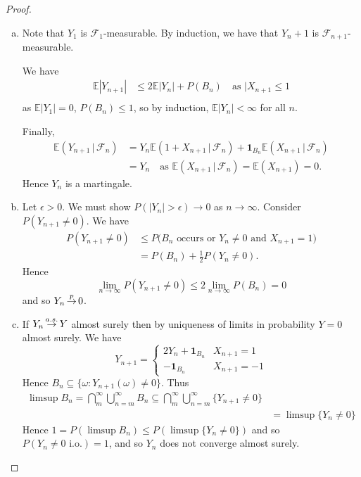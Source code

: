 \documentclass[10pt, oneside, reqno]{amsart}
\theoremstyle{plain}%
\theoremstyle{definition}
\theoremstyle{remark}
\newcommand{\given}{ \, | \,}
\newcommand{\sigf}{\mathcal{F}}
\newcommand{\E}{\mathbb{E}}
\def\cip{\,{\buildrel p \over \rightarrow}\,}
\def\cas{\,{\buildrel a.s. \over \rightarrow}\,}
\begin{document}
\begin{proof}{\ }\begin{enumerate}[(a)]
    \item Note that $Y_1$ is $\sigf_1$-measurable.  By induction, we have that $Y_n+1$ is $\sigf_{n+1}$-measurable.  
    
    We have \begin{align*}
        \E|Y_{n+1}| &\leq 2 \E|Y_n | + P(B_n)  \quad \text{as $|X_{n+1} \leq  1$}\\ 
    \end{align*}   as $\E|Y_1| = 0$, $P(B_n) \leq 1$, so by induction, $\E|Y_n| <\infty$ for all $n$.  
    
    Finally, \begin{align*}
        \E(Y_{n+1} \given \sigf_n) &= Y_n \E(1 + X_{n+1} \given \sigf_n) + \mathbf{1}_{B_n} \E(X_{n+1} \given \sigf_n) \\
                    &= Y_n \quad \text{as $\E(X_{n+1} \given \sigf_n) = \E(X_{n+1}) = 0$.}
    \end{align*}  Hence $Y_n$ is a martingale.
    \item Let $\epsilon > 0$.  We must show $P(|Y_n| > \epsilon) \rightarrow 0$ as $n \rightarrow \infty$.  Consider $P(Y_{n+1} \neq 0)$. We have \begin{align*}
        P(Y_{n+1} \neq 0) &\leq P(\text{$B_n$ occurs or $Y_{n} \neq 0$ and $X_{n+1} = 1$)} \\
                        &= P(B_n) + \frac{1}{2} P(Y_n \neq 0).
    \end{align*}  Hence \[
        \lim_{n \rightarrow \infty} P(Y_{n+1} \neq 0) \leq 2 \lim_{n \rightarrow \infty} P(B_n) = 0
    \] and so $Y_n \cip 0$.  
    \item If $Y_n \cas Y$ almost surely then by uniqueness of limits in probability $Y = 0$ almost surely.  We have \[
        Y_{n+1} = \begin{cases}
            2Y_{n} + \mathbf{1}_{B_n} & X_{n+1} = 1 \\
            -\mathbf{1}_{B_n} & X_{n+1} = -1
        \end{cases}
    \]  Hence $B_n \subseteq \{ \omega : Y_{n+1}( \omega) \neq 0 \}$.   Thus \begin{align*}
        \limsup B_n = \bigcap_{m}^\infty \bigcup_{n=m}^\infty B_{n} \subseteq \bigcap_{m}^\infty \bigcup_{n=m}^\infty \{ Y_{n+1} \neq 0 \} \\
        &= \limsup \{Y_n \neq 0 \}
    \end{align*}  Hence $1 = P(\limsup B_n) \leq P(\limsup \{ Y_n \neq 0 \})$ and so $P(Y_n \neq 0 \text{ i.o.}) = 1$, and so $Y_n$ does not converge almost surely.
\end{enumerate}
    
\end{proof}
\end{document}
